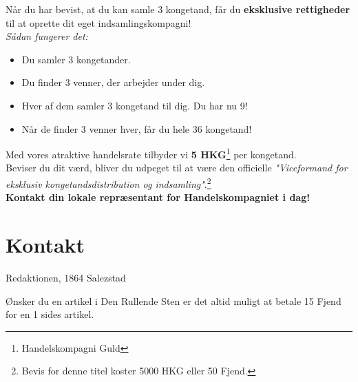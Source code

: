 \documentclass[letterpaper,12pt]{memoir}
\newcommand{\separator}{%
  \par\noindent{\color{black!40}\rule{\textwidth}{0.4pt}}\par
}
\begin{document}
Når du har bevist, at du kan samle 3 kongetand, får du \textbf{eksklusive rettigheder} til at oprette dit eget indsamlingskompagni! \\[1em]

\textit{Sådan fungerer det:}
\begin{itemize}
  \item Du samler 3 kongetander.
  \item Du finder 3 venner, der arbejder under dig.
  \item Hver af dem samler 3 kongetand til dig. Du har nu 9!
  \item Når de finder 3 venner hver, får du hele 36 kongetand!
\end{itemize}

Med vores atraktive handelsrate tilbyder vi \textbf{5 HKG}\footnote{Handelskompagni Guld} per kongetand. \\[0.5em]

Beviser du dit værd, bliver du udpeget til at være den officielle \textit{"Viceformand for eksklusiv kongetandsdistribution og indsamling"}.\footnote{Bevis for denne titel koster 5000 HKG eller 50 Fjend.} \\[1em]

\textbf{Kontakt din lokale repræsentant for Handelskompagniet i dag!}

\separator

\section*{Kontakt}
Redaktionen, 1864 Salezstad

Ønsker du en artikel i Den Rullende Sten er det altid muligt at betale 15 Fjend for en 1 sides artikel.
\end{document}

